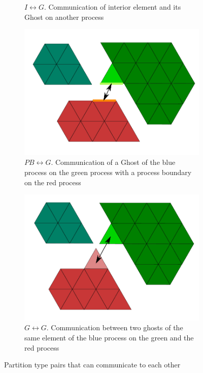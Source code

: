 \begin{figure}
\begin{subfigure}[b]{0.48\textwidth}
	  \captionsetup{width=0.8\textwidth} 
	  \caption{$I \leftrightarrow G$. Communication of interior element and its Ghost on another process }
	\end{subfigure}
	\begin{subfigure}[b]{0.48\textwidth}
	  \includegraphics[scale=0.4]{images/parallel-comm-PBG}
	  \captionsetup{width=0.8\textwidth} 
	  \caption{$PB \leftrightarrow G$. Communication of a Ghost of the blue process on the green process with a process boundary on the red process}
	\end{subfigure}
	\begin{subfigure}[b]{0.48\textwidth}
	  \includegraphics[scale=0.4]{images/parallel-comm-GG}
	  \captionsetup{width=0.8\textwidth} 
	  \caption{$G \leftrightarrow G$. Communication between two ghosts of the same element of the blue process on the green and the red process}
	\end{subfigure}
	\captionsetup{width=0.8\textwidth}
	\caption{ Partition type pairs that can communicate to each other}
	\label{fig:impl:comm:partitionpairs}
\end{figure}


